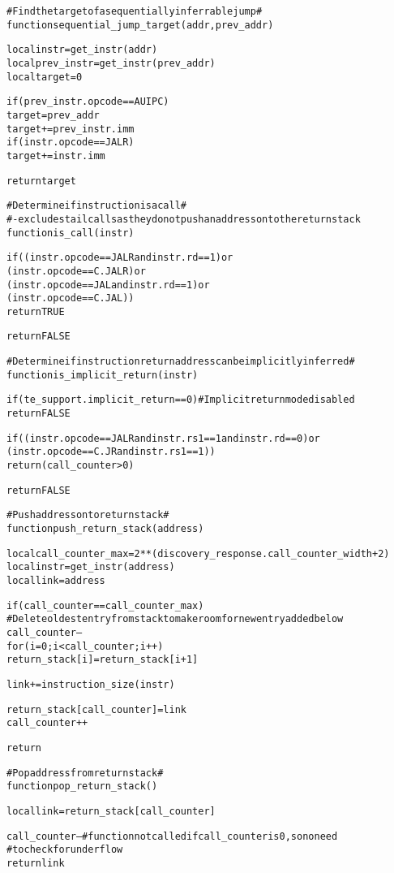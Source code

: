 \pagebreak

\begin{alltt}
# Find the target of a sequentially inferrable jump #
function sequential_jump_target (addr, prev_addr)

  local instr      = get_instr(addr)
  local prev_instr = get_instr(prev_addr)
  local target     = 0

  if (prev_instr.opcode == AUIPC)
    target = prev_addr
  target += prev_instr.imm
  if (instr.opcode == JALR)
    target += instr.imm

  return target

# Determine if instruction is a call #
# - excludes tail calls as they do not push an address onto the return stack
function is_call (instr)

  if ((instr.opcode == JALR and instr.rd == 1) or
      (instr.opcode == C.JALR)                 or
      (instr.opcode == JAL  and instr.rd == 1) or
      (instr.opcode == C.JAL))
    return TRUE

  return FALSE

# Determine if instruction return address can be implicitly inferred #
function is_implicit_return (instr)

  if (te_support.implicit_return == 0) # Implicit return mode disabled
    return FALSE

  if ((instr.opcode == JALR and instr.rs1 == 1 and instr.rd == 0) or
      (instr.opcode == C.JR and instr.rs1 == 1))
    return (call_counter > 0)

  return FALSE
\end{alltt}

\pagebreak

\begin{alltt}
# Push address onto return stack #
function push_return_stack (address)

  local call_counter_max = 2**(discovery_response.call_counter_width + 2)
  local instr            = get_instr(address)
  local link             = address

  if (call_counter == call_counter_max)
    # Delete oldest entry from stack to make room for new entry added below
    call_counter--
    for (i = 0; i < call_counter; i++)
      return_stack[i] = return_stack[i+1]

  link += instruction_size(instr)

  return_stack[call_counter] = link
  call_counter++

  return

# Pop address from return stack #
function pop_return_stack ()

  local link = return_stack[call_counter]

  call_counter-- # function not called if call_counter is 0, so no need
                 #  to check for underflow
  return link
\end{alltt}
